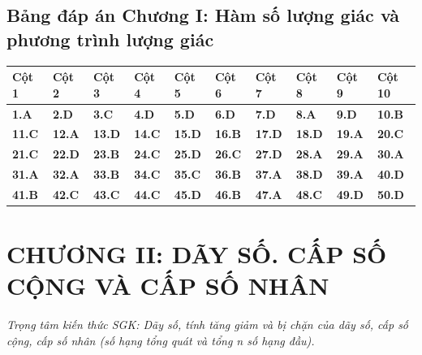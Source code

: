 \documentclass[11pt,a4paper]{article}
\begin{document}
\subsection*{\color{primary} Bảng đáp án Chương I: Hàm số lượng giác và phương trình lượng giác}
\begin{center}
\renewcommand{\arraystretch}{1.25}
\begin{tabularx}{\textwidth}{*{10}{>{\centering\arraybackslash}X}}
\toprule
\textbf{\color{primary} Cột 1} & \textbf{\color{primary} Cột 2} & \textbf{\color{primary} Cột 3} & \textbf{\color{primary} Cột 4} & \textbf{\color{primary} Cột 5} & \textbf{\color{primary} Cột 6} & \textbf{\color{primary} Cột 7} & \textbf{\color{primary} Cột 8} & \textbf{\color{primary} Cột 9} & \textbf{\color{primary} Cột 10} \\
\midrule
\textbf{1.A} & \textbf{2.D} & \textbf{3.C} & \textbf{4.D} & \textbf{5.D} & \textbf{6.D} & \textbf{7.D} & \textbf{8.A} & \textbf{9.D} & \textbf{10.B} \\
\rowcolor{rowtint} \textbf{11.C} & \textbf{12.A} & \textbf{13.D} & \textbf{14.C} & \textbf{15.D} & \textbf{16.B} & \textbf{17.D} & \textbf{18.D} & \textbf{19.A} & \textbf{20.C} \\
\textbf{21.C} & \textbf{22.D} & \textbf{23.B} & \textbf{24.C} & \textbf{25.D} & \textbf{26.C} & \textbf{27.D} & \textbf{28.A} & \textbf{29.A} & \textbf{30.A} \\
\rowcolor{rowtint} \textbf{31.A} & \textbf{32.A} & \textbf{33.B} & \textbf{34.C} & \textbf{35.C} & \textbf{36.B} & \textbf{37.A} & \textbf{38.D} & \textbf{39.A} & \textbf{40.D} \\
\textbf{41.B} & \textbf{42.C} & \textbf{43.C} & \textbf{44.C} & \textbf{45.D} & \textbf{46.B} & \textbf{47.A} & \textbf{48.C} & \textbf{49.D} & \textbf{50.D} \\
\bottomrule
\end{tabularx}
\end{center}\vspace{10pt}
\section*{\color{primary} CHƯƠNG II: DÃY SỐ. CẤP SỐ CỘNG VÀ CẤP SỐ NHÂN}
\textit{Trọng tâm kiến thức SGK: Dãy số, tính tăng giảm và bị chặn của dãy số, cấp số cộng, cấp số nhân (số hạng tổng quát và tổng n số hạng đầu).}\par\vspace{4pt}
\end{document}

